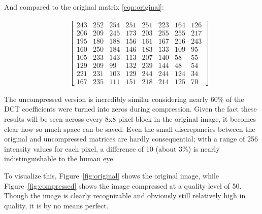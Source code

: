 \documentclass[11pt]{article}
\begin{document}
And compared to the original matrix \eqref{eqn:original}:

\begin{align*}
  \qquad\begin{bmatrix}
    243 & 252 & 254 & 251 & 251 & 223 & 164 & 126 \\
    206 & 209 & 245 & 173 & 203 & 255 & 255 & 217 \\
    195 & 180 & 188 & 156 & 161 & 167 & 216 & 243 \\
    160 & 250 & 184 & 146 & 183 & 133 & 109 &  95 \\
    105 & 233 & 143 & 113 & 207 & 140 &  58 &  55 \\
    129 & 209 &  99 & 132 & 239 & 144 &  48 &  54 \\
    221 & 231 & 103 & 129 & 244 & 244 & 124 &  34 \\
    167 & 235 & 111 & 151 & 218 & 214 & 125 &  70
  \end{bmatrix}
\end{align*}

The uncompressed version is incredibly similar considering nearly 60\% of the DCT coefficients were turned into zeros during compression.
Given the fact these results will be seen across every 8x8 pixel block in the original image, it becomes clear how so much space can be saved.
Even the small discrepancies between the original and uncompressed matrices are hardly consequential; with a range of 256 intensity values for each pixel, a difference of 10 (about 3\%) is nearly indistinguishable to the human eye.

To visualize this, Figure~\ref{fig:original} shows the original image, while Figure~\ref{fig:compressed} shows the image compressed at a quality level of 50.
Though the image is clearly recognizable and obviously still relatively high in quality, it is by no means perfect.
\end{document}

